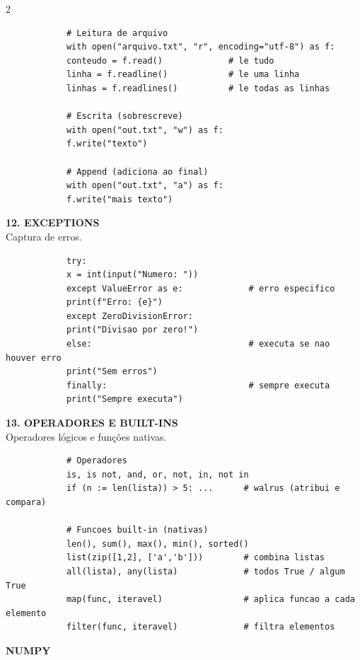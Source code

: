 \documentclass[a4paper]{article}
\begin{document}
\begin{multicols}{2}
\begin{lstlisting}
			# Leitura de arquivo
			with open("arquivo.txt", "r", encoding="utf-8") as f:
			conteudo = f.read()             # le tudo
			linha = f.readline()            # le uma linha
			linhas = f.readlines()          # le todas as linhas
			
			# Escrita (sobrescreve)
			with open("out.txt", "w") as f:
			f.write("texto")
			
			# Append (adiciona ao final)
			with open("out.txt", "a") as f:
			f.write("mais texto")
		\end{lstlisting}
		
		\noindent\textbf{12. EXCEPTIONS} \\
		Captura de erros.
		\begin{lstlisting}
			try:
			x = int(input("Numero: "))
			except ValueError as e:             # erro especifico
			print(f"Erro: {e}")
			except ZeroDivisionError:
			print("Divisao por zero!")
			else:                               # executa se nao houver erro
			print("Sem erros")
			finally:                            # sempre executa
			print("Sempre executa")
		\end{lstlisting}
		
		\noindent\textbf{13. OPERADORES E BUILT-INS} \\
		Operadores lógicos e funções nativas.
		\begin{lstlisting}
			# Operadores
			is, is not, and, or, not, in, not in
			if (n := len(lista)) > 5: ...      # walrus (atribui e compara)
			
			# Funcoes built-in (nativas)
			len(), sum(), max(), min(), sorted()
			list(zip([1,2], ['a','b']))        # combina listas
			all(lista), any(lista)             # todos True / algum True
			map(func, iteravel)                # aplica funcao a cada elemento
			filter(func, iteravel)             # filtra elementos
		\end{lstlisting}
		
		
		\columnbreak
		\vspace{0.2cm}
		{\large\bfseries NUMPY}
		

\end{multicols}
\end{document}
